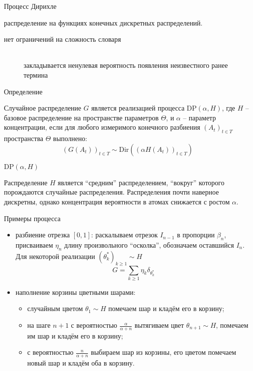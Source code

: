 \documentclass{beamer}
\newcommand{\clo}[1]{\left [ #1 \right ]}
\newcommand{\brac}[1]{\left ( #1 \right )}
\begin{document}
\begin{frame}{Процесс Дирихле}
  \begin{block}

    распределение на функциях конечных дискретных распределений.
    \begin{description}
      \item[нет ограничений на сложность словаря]\hfill\\
        закладывается ненулевая вероятность появления неизвестного ранее термина
    \end{description}
  \end{block}
  \begin{block}{Определение}

    Случайное распределение $G$ является реализацией процесса $\text{DP}\brac{\alpha,H}$, где $H$ -- базовое распределение на пространстве параметров $\Theta$, и $\alpha$ -- параметр концентрации, если для любого измеримого конечного разбиения $\brac{A_t}_{t\in T}$ пространства $\Theta$ выполнено:
    \[\brac{G(A_t)}_{t\in T}\sim \text{Dir}\brac{ \brac{\alpha H(A_t)}_{t\in T} }\] 

  \end{block}
\end{frame}

\begin{frame}{$\text{DP}\brac{\alpha,H}$}
  \begin{block}

    Распределение $H$ является ``средним'' распределением, ``вокруг'' которого порождаются случайные распределения.
    Распределения почти наверное дискретны, однако концентрация вероятности в атомах снижается с ростом $\alpha$.
  \end{block}
\end{frame}

\begin{frame}
  \begin{block}{Примеры процесса}

    \begin{itemize}
      \item разбиение отрезка $\clo{0,1}$: раскалываем отрезок $I_{n-1}$ в пропорции $\beta_n$, присваиваем $\eta_n$ длину произвольного ``осколка'', обозначаем оставшийся $I_n$. Для некоторой реализации $\brac{\theta_k^*}_{k\geq 1}\sim H$ \[G = \sum_{k\geq1} \eta_k \delta_{\theta_k^*}\]
      \item наполнение корзины цветными шарами: \begin{itemize}
        \item случайным цветом $\theta_1\sim H$ помечаем шар и кладём его в корзину;
        \item на шаге $n+1$ с вероятностью $\frac{\alpha}{\alpha+n}$ вытягиваем цвет $\theta_{n+1}\sim H$, помечаем им шар и кладём его в корзину;
        \item с вероятностью $\frac{n}{\alpha+n}$ выбираем шар из корзины, его цветом помечаем новый шар и кладём оба в корзину.
      \end{itemize} 
    \end{itemize}
  \end{block}
\end{frame}
\end{document}
